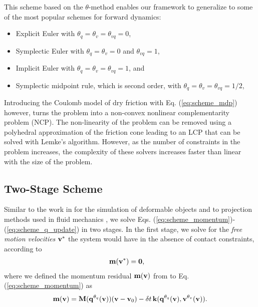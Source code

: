 This scheme based on the $\theta\text{-method}$ enables our framework to
generalize to some of the most popular schemes for forward dynamics:
\begin{itemize}
	\item Explicit Euler with $\theta_q=\theta_{v}=\theta_{vq} = 0$,
	\item Symplectic Euler with $\theta_{q} = \theta_v = 0$ and $\theta_{vq}=1$,
	\item Implicit Euler with $\theta_{q} = \theta_v = \theta_{vq}= 1$, and
	\item Symplectic midpoint rule, which is second order, with $\theta_{q} =
	\theta_v = \theta_{vq}= 1/2$,
\end{itemize}

Introducing the Coulomb model of dry friction with Eq. (\ref{eq:scheme_mdp})
however, turns the problem into a non-convex nonlinear complementarity problem
(NCP). The non-linearity of the problem can be removed using a polyhedral
approximation of the friction cone leading to an LCP that can be solved with
Lemke's algorithm. However, as the number of constraints in the problem
increases, the complexity of these solvers increases faster than linear
 with
the size of the problem.

\subsection{Two-Stage Scheme}

Similar to the work in \cite{bib:duriez2005realistic} for the simulation of
deformable objects and to projection methods used in fluid mechanics
\cite{bib::bell1991efficient}, we solve Eqs.
(\ref{eq:scheme_momentum})-(\ref{eq:scheme_q_update}) in two stages. In the
first stage, we solve for the \emph{free motion velocities} ${\mathbf{v}}^*$ the
system would have in the absence of contact constraints, according to
\begin{align}
	\mf{m}(\mf{v}^*) &= \mf{0},
	\label{eq:vstar_definition}
\end{align}
where we defined the momentum residual ${\mathbf{m}}({\mathbf{v}})$ from to Eq.
(\ref{eq:scheme_momentum}) as
\begin{multline}
	\mf{m}(\mf{v}) =
	\mf{M}(\mf{q}^{\theta_{q}}(\mf{v}))(\mf{v}-\mf{v}_0) -
	\delta t\,\mf{k}(\mf{q}^{\theta_{q}}(\mf{v}),\mf{v}^{\theta_v}(\mf{v})).
	\label{eq:m_definition}
\end{multline}


